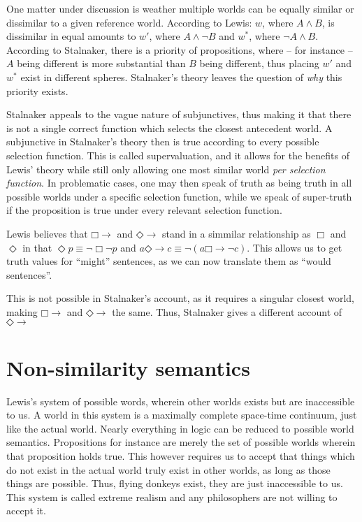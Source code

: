 \documentclass[12pt]{report}
\newcommand{\would}{{\mathbin{\Box}{\rightarrow}}}
\newcommand{\might}{{\mathbin{\Diamond}{\rightarrow}}}
\begin{document}
One matter under discussion is weather multiple worlds can be equally similar or
dissimilar to a given reference world. According to Lewis: $w$, where $A \land
B$, is dissimilar in equal amounts to $w'$, where $A \land \lnot B$ and $w^*$,
where $\lnot A \land B$. According to Stalnaker, there is a priority of
propositions, where -- for instance -- $A$ being different is more substantial
than $B$ being different, thus placing $w'$ and $w^*$ exist in different
spheres. Stalnaker's theory leaves the question of \emph{why} this priority
exists.

Stalnaker appeals to the vague nature of subjunctives, thus making it that there
is not a single correct function which selects the closest antecedent world. A
subjunctive in Stalnaker's theory then is true according to every possible
selection function. This is called supervaluation, and it allows for the
benefits of Lewis' theory while still only allowing one most similar world
\emph{per selection function}. In problematic cases, one may then speak of truth
as being truth in all possible worlds under a specific selection function, while
we speak of super-truth if the proposition is true under every relevant
selection function.

Lewis believes that $\would$ and $\might$ stand in a simmilar relationship as
$\Box$ and $\Diamond$ in that $\Diamond p \equiv \lnot \Box \lnot p$ and $a
\might c \equiv \lnot (a \would \lnot c)$. This allows us to get truth values
for ``might'' sentences, as we can now translate them as ``would sentences''.

This is not possible in Stalnaker's account, as it requires a singular closest
world, making $\would$ and $\might$ the same. Thus, Stalnaker gives a different
account of $\might$

\chapter{Non-similarity semantics}

Lewis's system of possible words, wherein other worlds exists but are
inaccessible to us. A world in this system is a maximally complete space-time
continuum, just like the actual world. Nearly everything in logic can be reduced
to possible world semantics. Propositions for instance are merely the set of
possible worlds wherein that proposition holds true. This however requires us to
accept that things which do not exist in the actual world truly exist in other
worlds, as long as those things are possible. Thus, flying donkeys exist, they
are just inaccessible to us. This system is called extreme realism and any
philosophers are not willing to accept it.
\end{document}
